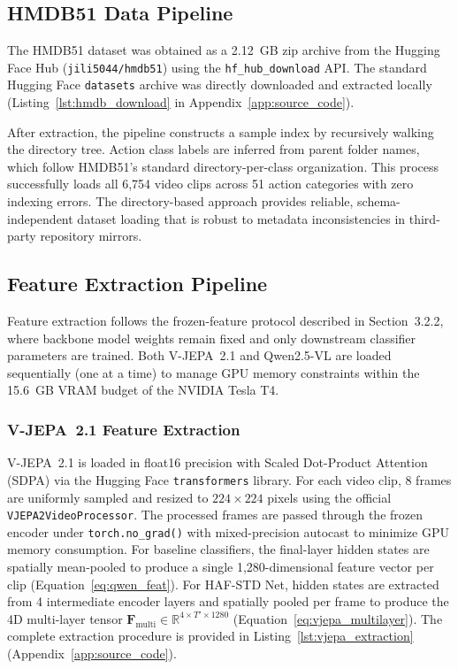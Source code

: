 \subsection{HMDB51 Data Pipeline}

The HMDB51 dataset was obtained as a 2.12~GB zip archive from the Hugging Face Hub (\texttt{jili5044/hmdb51}) using the \texttt{hf\_hub\_download} API. The standard Hugging Face \texttt{datasets}  archive was directly downloaded and extracted locally (Listing~\ref{lst:hmdb_download} in Appendix~\ref{app:source_code}).

After extraction, the pipeline constructs a sample index by recursively walking the directory tree. Action class labels are inferred from parent folder names, which follow HMDB51's standard directory-per-class organization. This process successfully loads all 6,754 video clips across 51 action categories with zero indexing errors. The directory-based approach provides reliable, schema-independent dataset loading that is robust to metadata inconsistencies in third-party repository mirrors.

\subsection{Feature Extraction Pipeline}

Feature extraction follows the frozen-feature protocol described in Section~3.2.2, where backbone model weights remain fixed and only downstream classifier parameters are trained. Both V-JEPA~2.1 and Qwen2.5-VL are loaded sequentially (one at a time) to manage GPU memory constraints within the 15.6~GB VRAM budget of the NVIDIA Tesla T4.

\subsubsection{V-JEPA~2.1 Feature Extraction}

V-JEPA~2.1 is loaded in float16 precision with Scaled Dot-Product Attention (SDPA) via the Hugging Face \texttt{transformers} library. For each video clip, 8 frames are uniformly sampled and resized to $224 \times 224$ pixels using the official \texttt{VJEPA2VideoProcessor}. The processed frames are passed through the frozen encoder under \texttt{torch.no\_grad()} with mixed-precision autocast to minimize GPU memory consumption. For baseline classifiers, the final-layer hidden states are spatially mean-pooled to produce a single 1,280-dimensional feature vector per clip (Equation~\ref{eq:qwen_feat}). For HAF-STD Net, hidden states are extracted from 4 intermediate encoder layers and spatially pooled per frame to produce the 4D multi-layer tensor $\mathbf{F}_{\text{multi}} \in \mathbb{R}^{4 \times T' \times 1280}$ (Equation~\ref{eq:vjepa_multilayer}). The complete extraction procedure is provided in Listing~\ref{lst:vjepa_extraction} (Appendix~\ref{app:source_code}).

